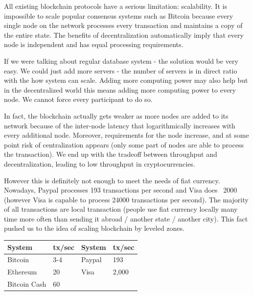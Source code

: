 \documentclass[portrait,a0paper,fontscale=0.305]{baposter} %
\begin{document}
\begin{poster}
{All existing blockchain protocols have a serious limitation: scalability. It is impossible to scale popular consensus systems such as Bitcoin because every single node on the network processes every transaction and maintains a copy of the entire state. The benefits of decentralization automatically imply that every node is independent and has equal processing requirements.

\vspace{0.5em}
If we were talking about regular database system - the solution would be very easy. We could just add more servers - the number of servers is in direct ratio with the how system can scale. Adding more computing power may also help but in the decentralized world this means adding more computing power to every node. We cannot force every participant to do so.

\vspace{0.5em}
In fact, the blockchain actually gets weaker as more nodes are added to its network because of the inter-node latency that logarithmically increases with every additional node. Moreover, requirements for the node increase, and at some point risk of centralization appears (only some part of nodes are able to process the transaction). We end up with the tradeoff between throughput and decentralization, leading to low throughput in cryptocurrencies.

\vspace{0.5em}
However this is definitely not enough to meet the needs of fiat currency. Nowadays, Paypal processes 193 transactions per second and Visa does ~2000 (however Visa is capable to process 24000 transactions per second). The majority of all transactions are local transaction (people use fiat currency locally many time more often than sending it abroad / another state / another city). This fact pushed us to the idea of scaling blockchain by leveled zones.

\vspace{-1.5em}
\begin{center}
\begin{tabular}{l l | l l}
\textbf{System} & \textbf{tx/sec} & \textbf{System} & \textbf{tx/sec} \\
\midrule
Bitcoin & 3-4 &        Paypal &  193 \\
Ethereum & 20 &        Visa & 2,000 \\
Bitcoin Cash & 60 &          &       \\


\end{tabular}
\end{center}

}
\end{poster}
\end{document}
